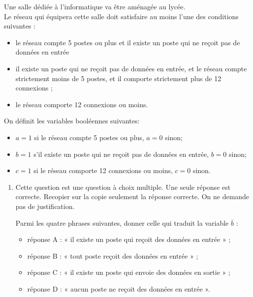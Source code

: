 \begin{exercice}[]
    Une salle dédiée à l'informatique va être aménagée au lycée.\\
    Le réseau qui équipera cette salle doit satisfaire au moins l'une des conditions suivantes :

    \begin{itemize}
        \item le réseau compte 5 postes ou plus et il existe un poste qui ne reçoit pas de données en entrée
        \item il existe un poste qui ne reçoit pas de données en entrée, et le réseau compte strictement moins  de 5 postes, et il comporte strictement plus de 12 connexions ;
        \item le réseau comporte 12 connexions ou moins.
    \end{itemize}

    On définit les variables booléennes suivantes:


    \begin{itemize}
        \item $a = 1$ si le réseau compte 5 postes ou plus, $a = 0$ sinon;
        \item $b = 1$ s'il existe un poste qui ne reçoit pas de données en entrée, $b = 0$ sinon;
        \item $c = 1$ si le réseau comporte 12 connexions ou moins, $c = 0$ sinon.
    \end{itemize}

    \begin{enumerate}
        \item Cette question est une question à choix multiple. Une seule réponse est correcte. Recopier sur la copie seulement la réponse correcte. On ne demande pas de justification.

              Parmi les quatre phrases suivantes, donner celle qui traduit la variable $\overline{b}$ :


              \begin{itemize}
                  \item réponse A : « il existe un poste qui reçoit des données en entrée  » ;
                  \item réponse B : « tout poste reçoit des données en entrée  » ;
                  \item réponse C : « il existe un poste qui envoie des données en sortie  » ;
                  \item réponse D : « aucun poste ne reçoit des données en entrée  ».
              \end{itemize}


\end{enumerate}
\end{exercice}
